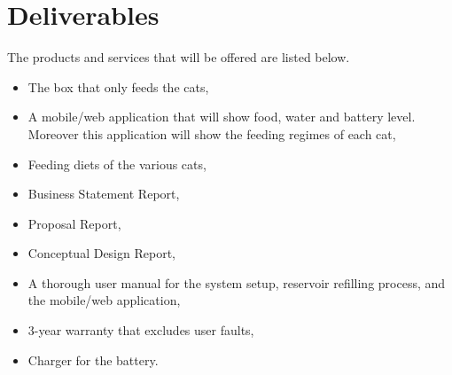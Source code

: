\section{Deliverables} \label{sec:deliverables}
The products and services that will be offered are listed below.
\begin{itemize}
\item The box that only feeds the cats,
\item A mobile/web application that will show food, water and battery level. Moreover this application will show the feeding regimes of each cat,
\item Feeding diets of the various cats,
\item Business Statement Report,
\item Proposal Report,
\item Conceptual Design Report,
\item A thorough user manual for the system setup, reservoir refilling process, and the mobile/web application,
\item 3-year warranty that excludes user faults,
\item Charger for the battery.
\end{itemize}